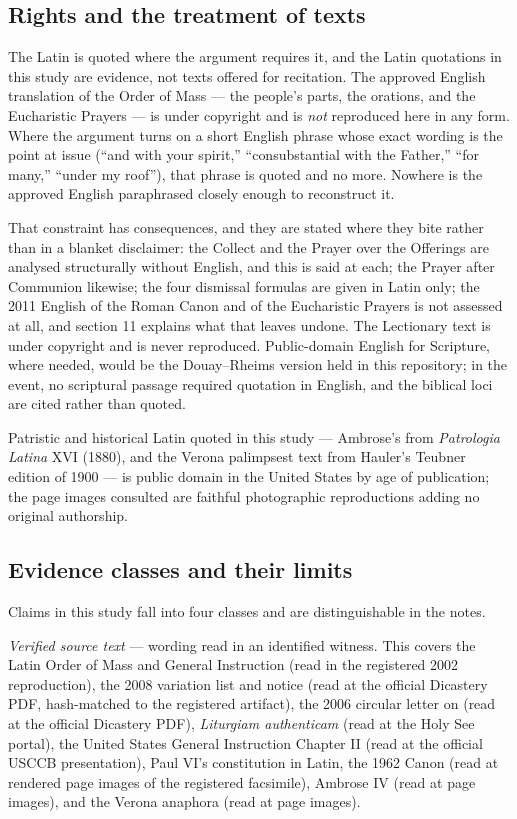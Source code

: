 \subsection*{Rights and the treatment of texts}

The Latin  is quoted where the argument requires it, and the Latin
quotations in this study are evidence, not texts offered for recitation. The approved English
translation of the Order of Mass --- the people's parts, the orations, and the Eucharistic
Prayers --- is under copyright and is \emph{not} reproduced here in any form. Where the argument
turns on a short English phrase whose exact wording is the point at issue (``and with your
spirit,'' ``consubstantial with the Father,'' ``for many,'' ``under my roof''), that phrase is
quoted and no more. Nowhere is the approved English paraphrased closely enough to reconstruct
it.

That constraint has consequences, and they are stated where they bite rather than in a blanket
disclaimer: the Collect and the Prayer over the Offerings are analysed structurally without
English, and this is said at each; the Prayer after Communion likewise; the four dismissal
formulas are given in Latin only; the 2011 English of the Roman Canon and of the Eucharistic
Prayers is not assessed at all, and section 11 explains what that leaves undone. The Lectionary
text is under copyright and is never reproduced. Public-domain English for Scripture, where
needed, would be the Douay--Rheims version held in this repository; in the event, no scriptural
passage required quotation in English, and the biblical loci are cited rather than quoted.

Patristic and historical Latin quoted in this study --- Ambrose's  from
\emph{Patrologia Latina} XVI (1880), and the Verona palimpsest text from Hauler's Teubner
edition of 1900 --- is public domain in the United States by age of publication; the page images
consulted are faithful photographic reproductions adding no original authorship.

\subsection*{Evidence classes and their limits}

Claims in this study fall into four classes and are distinguishable in the notes.

\emph{Verified source text} --- wording read in an identified witness. This covers the Latin
Order of Mass and General Instruction (read in the registered 2002 reproduction), the 2008
variation list and notice (read at the official Dicastery PDF, hash-matched to the registered
artifact), the 2006 circular letter on  (read at the official Dicastery PDF),
\emph{Liturgiam authenticam} (read at the Holy See portal), the United States General
Instruction Chapter II (read at the official USCCB presentation), Paul VI's constitution
 in Latin, the 1962 Canon (read at rendered page images of the registered
facsimile), Ambrose  IV (read at page images), and the Verona anaphora
(read at page images).


